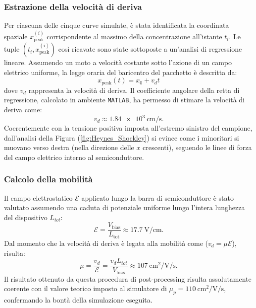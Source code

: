 \documentclass[a4paper,11pt]{report}
\begin{document}
\subsubsection{Estrazione della velocità di deriva}
Per ciascuna delle cinque curve simulate, è stata identificata la coordinata spaziale $x_{\text{peak}}^{(i)}$ corrispondente al massimo della concentrazione all'istante $t_i$.
Le tuple $(t_i, x_{\text{peak}}^{(i)})$ così ricavate sono state sottoposte a un'analisi di regressione lineare. Assumendo un moto a velocità costante sotto l'azione di un campo elettrico uniforme, la legge oraria del baricentro del pacchetto è descritta da:
\begin{equation}
    x_{\text{peak}}(t) = x_0 + v_d t
\end{equation}
dove $v_d$ rappresenta la velocità di deriva. Il coefficiente angolare della retta di regressione, calcolato in ambiente \texttt{MATLAB}, ha permesso di stimare la velocità di deriva come:
\begin{equation}
   v_d \approx \SI{1.84e3}{\centi\meter\per\second}.
\end{equation}
Coerentemente con la tensione positiva imposta all'estremo sinistro del campione, dall'analisi della Figura (\ref{fig:Heynes_Shockley}) si evince come i minoritari si muovano verso destra (nella direzione delle $x$ crescenti), seguendo le linee di forza del campo elettrico interno al semiconduttore.

\subsubsection{Calcolo della mobilità}
Il campo elettrostatico $\mathcal{E}$ applicato lungo la barra di semiconduttore è stato valutato assumendo una caduta di potenziale uniforme lungo l'intera lunghezza del dispositivo $L_{tot}$:
\begin{equation}
    \mathcal{E} = \frac{V_{\text{bias}}}{L_{\text{tot}}} \approx \SI{17.7}{\volt\per\centi\meter}.
\end{equation}
Dal momento che la velocità di deriva è legata alla mobilità come ($v_d = \mu \mathcal{E}$), risulta:
\begin{equation}
    \mu = \frac{v_d}{\mathcal{E}} = \frac{v_d L_{tot}}{V_{\text{bias}}} \approx \SI{107}{\centi\meter\squared\per\volt\per\second}.
\end{equation}
Il risultato ottenuto da questa procedura di post-processing risulta assolutamente coerente con il valore teorico imposto al simulatore di $\mu_p = \SI{110}{\centi\meter\squared\per\volt\per\second}$, confermando la bontà della simulazione eseguita.
\end{document}
